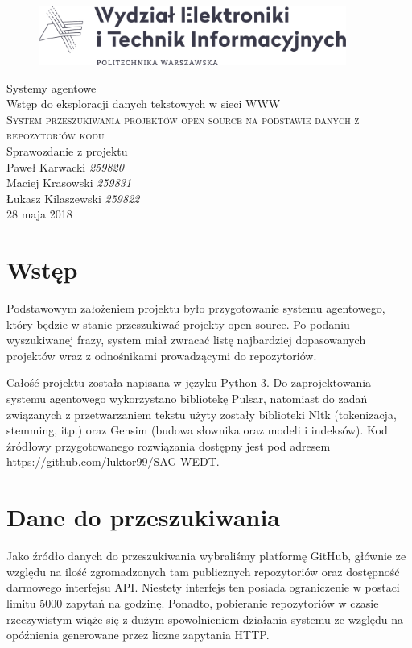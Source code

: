 \documentclass[12pt, oneside, final]{report}
\begin{document}
\begin{titlepage}
	\centering
	\begin{figure}
		\centering
		\includegraphics[width=0.9\textwidth]{logo.pdf}
	\end{figure}
	\vspace*{60pt}
	\Large{Systemy agentowe}\\
	\Large{Wstęp do eksploracji danych tekstowych w sieci WWW}\\
	\vspace{60pt}
	\textsc{\Huge{System przeszukiwania projektów open source na podstawie danych z repozytoriów kodu}}\\
	\vspace{20pt}
	\large{Sprawozdanie z projektu}\\
	\vspace{120pt}
	\Large{Paweł Karwacki \textit{259820}}\\
	\Large{Maciej Krasowski \textit{259831}}\\
	\Large{Łukasz Kilaszewski \textit{259822}}\\
	\vfill
	\large{28 maja 2018}
\end{titlepage}

\thispagestyle{empty}

\section*{Wstęp}
Podstawowym założeniem projektu było przygotowanie systemu agentowego, który będzie w stanie przeszukiwać projekty open source. Po podaniu wyszukiwanej frazy, system miał zwracać listę najbardziej dopasowanych projektów wraz z odnośnikami prowadzącymi do repozytoriów.

Całość projektu została napisana w języku Python 3. Do zaprojektowania systemu agentowego wykorzystano bibliotekę Pulsar, natomiast do zadań związanych z przetwarzaniem tekstu użyty zostały biblioteki Nltk (tokenizacja, stemming, itp.) oraz Gensim (budowa słownika oraz modeli i indeksów). Kod źródłowy przygotowanego rozwiązania dostępny jest pod adresem \url{https://github.com/luktor99/SAG-WEDT}.

\section*{Dane do przeszukiwania}
Jako źródło danych do przeszukiwania wybraliśmy platformę GitHub, głównie ze względu na ilość zgromadzonych tam publicznych repozytoriów oraz dostępność darmowego interfejsu API. Niestety interfejs ten posiada ograniczenie w postaci limitu 5000 zapytań na godzinę. Ponadto, pobieranie repozytoriów w czasie rzeczywistym wiąże się z dużym spowolnieniem działania systemu ze względu na opóźnienia generowane przez liczne zapytania HTTP.
\end{document}
